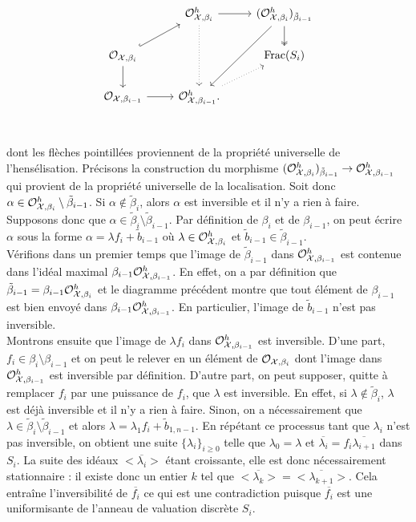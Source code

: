 \documentclass[11pt]{article}
\begin{document}
\[\begin{tikzcd}
 & \CO_{\CX,\beta_i}^h  & (\CO_{\CX,\beta_i}^h)_{\tilde{\beta}_{i-1}}\\
\CO_{\CX,\beta_i} &  & \text{Frac}(S_i)\\
\CO_{\CX,\beta_{i-1}} & \CO_{\CX,\beta_{i-1}}^h.\\
     \arrow[from=2-1, to=1-2, hook]
     \arrow[from=1-3, to=2-3, two heads]
     \arrow[from=1-2, to=1-3]
     \arrow[from=1-2, to=3-2, dotted]
     \arrow[from=2-1, to=3-1]
     \arrow[from=1-3, to=3-2]
     \arrow[from=3-2, to=2-3, dotted]
     \arrow[from=3-1, to=3-2]
\end{tikzcd}\]
dont les flèches pointillées proviennent de la propriété universelle de l'hensélisation. Précisons la construction du morphisme $(\mathcal{O}_{\mathcal{X},\beta_i}^h)_{\tilde{\beta}_{i-1}} \rightarrow \mathcal{O}_{\mathcal{X},\beta_{i-1}}^h$ qui provient de la propriété universelle de la localisation. Soit donc $\alpha \in \mathcal{O}_{\mathcal{X},\beta_i}^h \setminus \tilde{\beta}_{i-1}$. Si $\alpha \notin \tilde{\beta}_i$, alors $\alpha$ est inversible et il n'y a rien à faire. Supposons donc que $\alpha \in \tilde{\beta}_i \setminus \tilde{\beta}_{i-1}$. Par définition de $\beta_i$ et de $\beta_{i-1}$, on peut écrire $\alpha$ sous la forme $\alpha = \lambda f_i + \tilde{b}_{i-1}$ où $\lambda \in \mathcal{O}_{\mathcal{X},\beta_i}^h$ et $\tilde{b}_{i-1} \in \tilde{\beta}_{i-1}$.\\

Vérifions dans un premier temps que l'image de $\tilde{\beta}_{i-1}$ dans $\mathcal{O}_{\mathcal{X},\beta_{i-1}}^h$ est contenue dans l'idéal maximal $\beta_{i-1}\mathcal{O}_{\mathcal{X},\beta_{i-1}}^h$. En effet, on a par définition que $\tilde{\beta}_{i-1} = \beta_{i-1}\mathcal{O}_{\mathcal{X},\beta_i}^h$ et le diagramme précédent montre que tout élément de $\beta_{i-1}$ est bien envoyé dans $\beta_{i-1}\mathcal{O}_{\mathcal{X},\beta_{i-1}}^h$. En particulier, l'image de $\tilde{b}_{i-1}$ n'est pas inversible.\\

Montrons ensuite que l'image de $\lambda f_i$ dans $\mathcal{O}_{\mathcal{X},\beta_{i-1}}^h$ est inversible. D'une part, $f_i \in \beta_i \setminus \beta_{i-1}$ et on peut le relever en un élément de $\mathcal{O}_{\mathcal{X},\beta_i}$ dont l'image dans $\mathcal{O}_{\mathcal{X},\beta_{i-1}}^h$ est inversible par définition. D'autre part, on peut supposer, quitte à remplacer $f_i$ par une puissance de $f_i$, que $\lambda$ est inversible. En effet, si $\lambda \notin \tilde{\beta}_i$, $\lambda$ est déjà inversible et il n'y a rien à faire. Sinon, on a nécessairement que $\lambda \in \tilde{\beta}_i \setminus \tilde{\beta}_{i-1}$ et alors $\lambda = \lambda_1f_i + \tilde{b}_{1,n-1}$. En répétant ce processus tant que $\lambda_i$ n'est pas inversible, on obtient une suite $\{\lambda_i\}_{i\geq 0}$ telle que $\lambda_0 = \lambda$ et $\overline{\lambda_i}=f_i\overline{\lambda_{i+1}}$ dans $S_i$.
La suite des idéaux $<\overline{\lambda_i}>$  étant croissante, elle est donc nécessairement stationnaire : il existe donc un entier $k$ tel que $<\overline{\lambda_k}> = <\overline{\lambda_{k+1}}>$. Cela entraîne l'inversibilité de $\overline{f_i}$ ce qui est une contradiction puisque $\overline{f_i}$ est une uniformisante de l'anneau de valuation discrète $S_i$.\\
\end{document}
